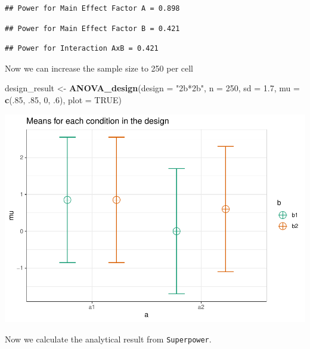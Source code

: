 \documentclass[]{book}
\newenvironment{Shaded}{\begin{snugshade}}{\end{snugshade}}
\newcommand{\DataTypeTok}[1]{\textcolor[rgb]{0.13,0.29,0.53}{#1}}
\newcommand{\DecValTok}[1]{\textcolor[rgb]{0.00,0.00,0.81}{#1}}
\newcommand{\FloatTok}[1]{\textcolor[rgb]{0.00,0.00,0.81}{#1}}
\newcommand{\KeywordTok}[1]{\textcolor[rgb]{0.13,0.29,0.53}{\textbf{#1}}}
\newcommand{\NormalTok}[1]{#1}
\newcommand{\OtherTok}[1]{\textcolor[rgb]{0.56,0.35,0.01}{#1}}
\newcommand{\StringTok}[1]{\textcolor[rgb]{0.31,0.60,0.02}{#1}}
\begin{document}
\begin{verbatim}
## Power for Main Effect Factor A = 0.898
\end{verbatim}

\begin{verbatim}
## Power for Main Effect Factor B = 0.421
\end{verbatim}

\begin{verbatim}
## Power for Interaction AxB = 0.421
\end{verbatim}

Now we can increase the sample size to 250 per cell

\begin{Shaded}
\begin{Highlighting}[]
\NormalTok{design_result <-}\StringTok{ }\KeywordTok{ANOVA_design}\NormalTok{(}\DataTypeTok{design =} \StringTok{"2b*2b"}\NormalTok{,}
                              \DataTypeTok{n =} \DecValTok{250}\NormalTok{,}
                              \DataTypeTok{sd =} \FloatTok{1.7}\NormalTok{,}
                              \DataTypeTok{mu =} \KeywordTok{c}\NormalTok{(.}\DecValTok{85}\NormalTok{, }\FloatTok{.85}\NormalTok{, }
                                     \DecValTok{0}\NormalTok{, }\FloatTok{.6}\NormalTok{),}
                              \DataTypeTok{plot =} \OtherTok{TRUE}\NormalTok{)}
\end{Highlighting}
\end{Shaded}

\includegraphics{SuperpowerValidation_files/figure-latex/aberson_5.3-1.pdf}

Now we calculate the analytical result from \texttt{Superpower}.
\end{document}
